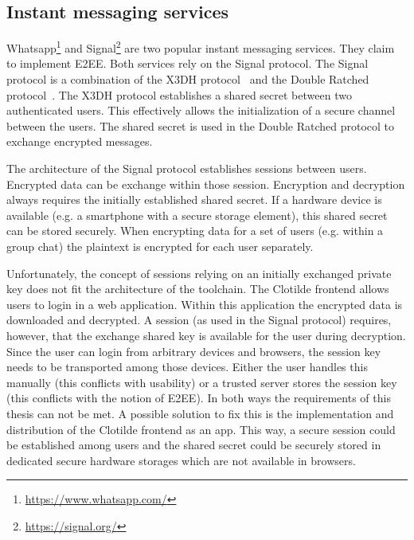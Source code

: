 \documentclass[../main.tex]{subfiles}
\begin{document}
\subsection{Instant messaging services}
Whatsapp\footnote{\url{https://www.whatsapp.com/}} and Signal\footnote{\url{https://signal.org/}} are two popular instant messaging services.
They claim to implement E2EE.
Both services rely on the Signal protocol.
The Signal protocol is a combination of the X3DH protocol~\cite{Marlinspike2016} and the Double Ratched protocol~\cite{Perrin2016}.
The X3DH protocol establishes a shared secret between two authenticated users.
This effectively allows the initialization of a secure channel between the users.
The shared secret is used in the Double Ratched protocol to exchange encrypted messages.~\cite{Marlinspike2016, Perrin2016}

The architecture of the Signal protocol establishes sessions between users.
Encrypted data can be exchange within those session.
Encryption and decryption always requires the initially established shared secret.
If a hardware device is available (e.g. a smartphone with a secure storage element), this shared secret can be stored securely. 
When encrypting data for a set of users (e.g. within a group chat) the plaintext is encrypted for each user separately.~\cite{Marlinspike2014}

Unfortunately, the concept of sessions relying on an initially exchanged private key does not fit the architecture of the toolchain.
The Clotilde frontend allows users to login in a web application.
Within this application the encrypted data is downloaded and decrypted.
A session (as used in the Signal protocol) requires, however, that the exchange shared key is available for the user during decryption.
Since the user can login from arbitrary devices and browsers, the session key needs to be transported among those devices.
Either the user handles this manually (this conflicts with usability) or a trusted server stores the session key (this conflicts with the notion of E2EE).
In both ways the requirements of this thesis can not be met.
A possible solution to fix this is the implementation and distribution of the Clotilde frontend as an app.
This way, a secure session could be established among users and the shared secret could be securely stored in dedicated secure hardware storages which are not available in browsers.
\end{document}
